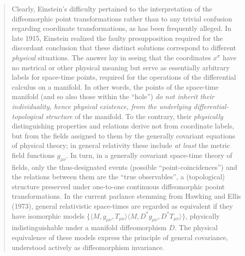 \begin{quote}
    Clearly, Einstein's difficulty pertained to the interpretation of the diffeomorphic point transformations rather than to any trivial confusion regarding coordinate transformations, as has been frequently alleged.  In late 1915, Einstein realized the faulty presupposition required for the discordant conclusion that these distinct solutions correspond to different \emph{physical} situations.  The answer lay in seeing that the coordinates $x^{\sigma}$ have no metrical or other physical meaning but serve as essentially arbitrary labels for space-time points, required for the operations of the differential calculus on a manifold.  In other words, the points of the space-time manifold (and so also those within the ``hole'') \emph{do not inherit their individuality, hence physical existence, from the underlying differential-topological structure} of the manifold.  To the contrary, their \emph{physically} distinguishing properties and relations derive not from coordinate labels, but from the fields assigned to them by the generally covariant equations of physical theory; in general relativity these include \emph{at least} the metric field functions $g_{\mu\nu}$.  In turn, in a generally covariant space-time theory of fields, only the thus-designated events (possible ``point-coincidences'') and the relations between them are the ``true observables'', a (topological) structure preserved under one-to-one continuous diffeomorphic pooint transformations.  In the current parlance stemming from Hawking and Ellis (1973), general relativistic space-times are regarded as equivalent if they have isomorphic models $\{\langle M,g_{\mu\nu}, T_{\mu\nu}\rangle \langle M, D^*g_{\mu\nu}, D^*T_{\mu\nu}  \rangle\}$, physically indistinguishable under a manifold diffeomorphism $D$.  The physical equivalence of these models express the principle of general covariance, understood actively as diffeomorphism invariance.
    

\end{quote}
